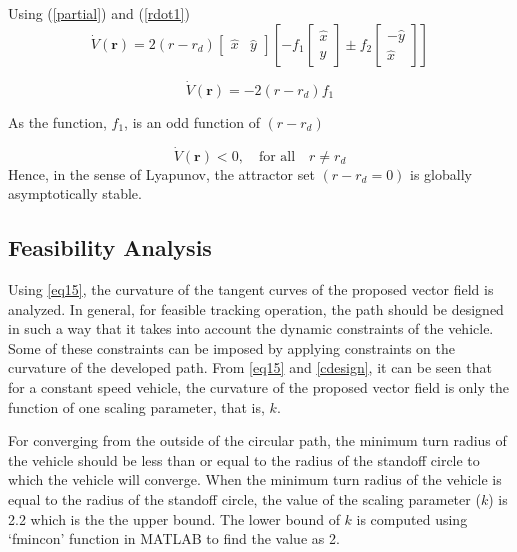 \documentclass[Afour,sagev,times]{sagej}
\begin{document}
Using (\ref{partial}) and (\ref{rdot1}) 
\begin{equation}
\dot{V}(\boldsymbol{r}) =2(r-r_{d})\begin{bmatrix}
	\hat{x} & \hat{y}
\end{bmatrix}\left[{-f_{1}\begin{bmatrix}
		\hat{x}\\ \hat{y}
		
\end{bmatrix}} \pm {f_{2}\begin{bmatrix}
		-\hat{y}\\ \hat{x}
		
\end{bmatrix}}\right]
\end{equation}

\begin{equation}
\dot{V}(\boldsymbol{r})=-2(r-r_{d})f_{1}
\end{equation}

As the function, $f_{1}$, is an odd function of $(r-r_d)$

\begin{equation}
\dot{V}(\boldsymbol{r}) < 0 , \quad \textrm{for all} \quad r\neq r_{d}  
\end{equation}
Hence, in the sense of Lyapunov, the attractor set $(r-r_{d}=0)$ is globally asymptotically stable. 



\subsection{Feasibility Analysis}

Using \eqref{eq15}, the curvature of the tangent curves of the proposed vector field is analyzed. In general, for feasible tracking operation, the path should be designed in such a way that it takes into account the dynamic constraints of the vehicle. Some of these constraints can be imposed by applying constraints on the curvature of the developed path. From \eqref{eq15} and \eqref{cdesign}, it can be seen that for a constant speed vehicle, the curvature of the proposed vector field is only the function of one scaling parameter, that is, $k$.

For converging from the outside of the circular path, the minimum turn radius of the vehicle should be less than or equal to the radius of the standoff circle to which the vehicle will converge. When the minimum turn radius of the vehicle is equal to the radius of the standoff circle, the value of the scaling parameter ($k$) is 2.2 which is the the upper bound. The lower bound of $k$ is computed using `fmincon' function in MATLAB to find the value as 2. 
\end{document}
